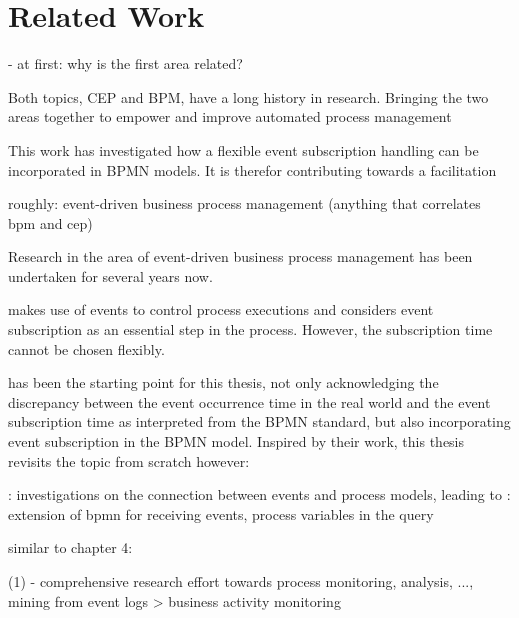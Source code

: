 \chapter{Related Work}\label{ch:relatedwork}

- at first: why is the first area related?

Both topics, \ac{CEP} and \ac{BPM}, have a long history in research.
Bringing the two areas together to empower and improve automated process management


This work has investigated how a flexible event subscription handling can be incorporated in BPMN models.
It is therefor contributing towards a facilitation 

roughly: event-driven business process management (anything that correlates bpm and cep)

Research in the area of event-driven business process management has been undertaken for several years now.



\cite{Pufahl2017} makes use of events to control process executions and considers event subscription as an essential step in the process. However, the subscription time cannot be chosen flexibly.

\cite{mandal:2017} has been the starting point for this thesis, not only acknowledging the discrepancy between the event occurrence time in the real world and the event subscription time as interpreted from the BPMN standard, but also incorporating event subscription in the BPMN model.
Inspired by their work, this thesis revisits the topic from scratch
however: 

\cite{Cabanillas2014}: investigations on the connection between events and process models, leading to \cite{Baumgrass2016}: extension of bpmn for receiving events, process variables in the query

similar to chapter 4:





(1)
- comprehensive research effort towards process monitoring, analysis, ..., mining from event logs
\cite{janiesch:poc-eventdriven-bam}
> business activity monitoring


